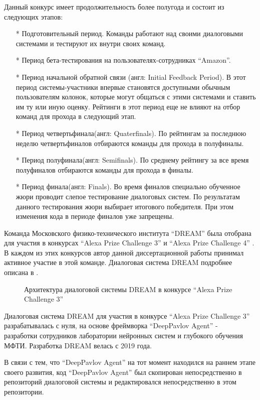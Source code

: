 Данный конкурс имеет продолжительность более полугода и состоит из следующих этапов:
\begin{itemize}
\item[*] Подготовительный период. Команды работают над своими диалоговыми системами и тестируют их внутри своих команд.
\item[*] Период бета-тестирования на пользователях-сотрудниках “Amazon”. 
\item[*] Период начальной обратной связи (англ: Initial Feedback Period). В этот период системы-участники впервые становятся доступными обычным пользователям колонок, которые могут общаться с этими системами и ставить им ту или иную оценку. Рейтинги в этот период еще не влияют на отбор команд для прохода в следующий этап.
\item[*] Период четвертьфинала(англ: Quaterfinals). По рейтингам за последнюю неделю четвертьфиналов отбираются команды для прохода в полуфиналы.
\item[*] Период полуфинала(англ: Semifinals). По среднему рейтингу за все время полуфиналов отбираются команды для прохода в финалы.
\item[*] Период финала(англ: Finals). Во время финалов специально обученное жюри проводит слепое тестирование диалоговых систем. По результатам данного тестирования жюри выбирает итогового победителя. При этом изменения кода в периоде финалов уже запрещены.
\end{itemize}

Команда Московского физико-технического института “DREAM” была отобрана для участия в конкурсах “Alexa Prize Challenge 3” \cite{na_website_ndh} и “Alexa Prize Challenge 4” \cite{na_website_ndi}. В каждом из этих конкурсов автор данной диссертационной работы принимал активное участие в этой команде. Диалоговая система DREAM подробнее описана в \cite{dream1}\cite{dream1_trudy}\cite{dream2}.

\begin{figure}[ht]
  \caption{Архитектура диалоговой системы DREAM в конкурсе “Alexa Prize Challenge 3”}\label{fig:dream1}
\end{figure}


Диалоговая система DREAM для участия в конкурсе “Alexa Prize Challenge 3” разрабатывалась с нуля, на основе фреймворка “DeepPavlov Agent” -  разработки сотрудников лаборатории нейронных систем и глубокого обучения МФТИ. Разработка DREAM велась с 2019 года.

В связи с тем, что “DeepPavlov Agent” на тот момент находился на раннем этапе своего развития, код “DeepPavlov Agent” был скопирован непосредственно в репозиторий диалоговой системы и редактировался непосредственно в этом репозитории.  

